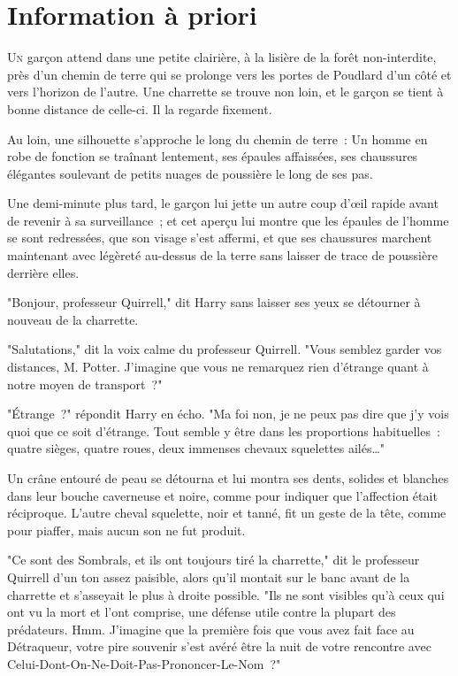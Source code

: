 \chapter{Information à priori}

\lettrine{U}{n} garçon attend dans une petite clairière, à la lisière de la forêt non-interdite, près d'un chemin de terre qui se prolonge vers les portes de Poudlard d'un côté et vers l'horizon de l'autre. Une charrette se trouve non loin, et le garçon se tient à bonne distance de celle-ci. Il la regarde fixement.

Au loin, une silhouette s'approche le long du chemin de terre~: Un homme en robe de fonction se traînant lentement, ses épaules affaissées, ses chaussures élégantes soulevant de petits nuages de poussière le long de ses pas.

Une demi-minute plus tard, le garçon lui jette un autre coup d'œil rapide avant de revenir à sa surveillance~; et cet aperçu lui montre que les épaules de l'homme se sont redressées, que son visage s'est affermi, et que ses chaussures marchent maintenant avec légèreté au-dessus de la terre sans laisser de trace de poussière derrière elles.

"Bonjour, professeur Quirrell," dit Harry sans laisser ses yeux se détourner à nouveau de la charrette.

"Salutations," dit la voix calme du professeur Quirrell. "Vous semblez garder vos distances, M. Potter. J'imagine que vous ne remarquez rien d'étrange quant à notre moyen de transport~?"

"Étrange~?" répondit Harry en écho. "Ma foi non, je ne peux pas dire que j'y vois quoi que ce soit d'étrange. Tout semble y être dans les proportions habituelles~: quatre sièges, quatre roues, deux immenses chevaux squelettes ailés…"

Un crâne entouré de peau se détourna et lui montra ses dents, solides et blanches dans leur bouche caverneuse et noire, comme pour indiquer que l'affection était réciproque. L'autre cheval squelette, noir et tanné, fit un geste de la tête, comme pour piaffer, mais aucun son ne fut produit.

"Ce sont des Sombrals, et ils ont toujours tiré la charrette," dit le professeur Quirrell d'un ton assez paisible, alors qu'il montait sur le banc avant de la charrette et s'asseyait le plus à droite possible. "Ils ne sont visibles qu'à ceux qui ont vu la mort et l'ont comprise, une défense utile contre la plupart des prédateurs. Hmm. J'imagine que la première fois que vous avez fait face au Détraqueur, votre pire souvenir s'est avéré être la nuit de votre rencontre avec Celui-Dont-On-Ne-Doit-Pas-Prononcer-Le-Nom~?"

